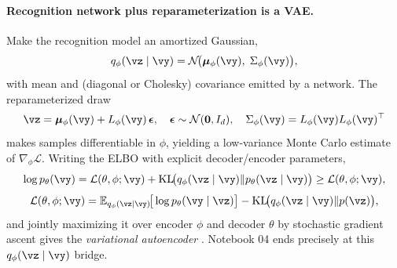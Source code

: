 \documentclass[11pt]{article}
\theoremstyle{plain}
\theoremstyle{definition}
\theoremstyle{remark}
\theoremstyle{definition}
\newcommand{\E}{\mathbb{E}}
\newcommand{\Normal}{\mathcal{N}}
\newcommand{\vmu}{\bm{\mu}}
\begin{document}
\paragraph{Recognition network plus reparameterization is a VAE.} Make the
recognition model an amortized Gaussian,
\begin{equation}\label{eq:vae-recog}
    q_{\phi}(\vz\mid\vy) = \Normal\!\big(\vmu_{\phi}(\vy),\; \Sigma_{\phi}(\vy)\big) ,
\end{equation}
with mean and (diagonal or Cholesky) covariance emitted by a network. The
reparameterized draw
\begin{equation}\label{eq:vae-reparam}
    \vz = \vmu_{\phi}(\vy) + L_{\phi}(\vy)\,\bm{\epsilon}, \quad
    \bm{\epsilon}\sim\Normal(\mathbf 0, I_d), \quad
    \Sigma_{\phi}(\vy) = L_{\phi}(\vy) L_{\phi}(\vy)\trp
\end{equation}
makes samples differentiable in $\phi$, yielding a low-variance Monte Carlo
estimate of $\nabla_{\phi}\mathcal{L}$. Writing the ELBO with explicit
decoder/encoder parameters,
\begin{equation}\label{eq:vae-elbo}
    \log p_{\theta}(\vy) = \mathcal{L}(\theta,\phi;\vy)
        + \mathrm{KL}\!\big(q_{\phi}(\vz\mid\vy)\Vert p_{\theta}(\vz\mid\vy)\big)
        \geq \mathcal{L}(\theta,\phi;\vy),
\end{equation}
\begin{equation}\label{eq:vae-elbo2}
    \mathcal{L}(\theta,\phi;\vy) = \E_{q_{\phi}(\vz\mid\vy)}\!\big[\log p_{\theta}(\vy\mid\vz)\big]
        - \mathrm{KL}\!\big(q_{\phi}(\vz\mid\vy)\Vert p(\vz)\big),
\end{equation}
and jointly maximizing it over encoder $\phi$ and decoder $\theta$ by stochastic
gradient ascent gives the \emph{variational autoencoder}
\parencite{KingmaWelling2014-vae, Rezende2014-sbp}. Notebook 04 ends precisely at
this $q_{\phi}(\vz\mid\vy)$ bridge.
\end{document}
